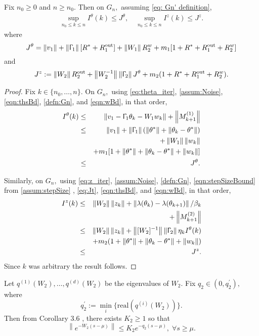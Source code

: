 \documentclass[usenames,dvipsnames,final,12pt]{colt2018} %
\newcommand{\vt}{v_1}
\newcommand{\Wt}{W_1}
\newcommand{\Tt}{\Upgamma_1}
\newcommand{\Mt}{M^{(1)}}
\newcommand{\mt}{m_1}
\newcommand{\Rto}{R_1^\textrm{out}}
\newcommand{\thS}{\theta^*}
\newcommand{\Tw}{\Upgamma_2}
\newcommand{\Ww}{W_2}
\newcommand{\Mw}{M^{(2)}}
\newcommand{\sw}{\beta}
\newcommand{\mw}{m_2}
\newcommand{\lz}{q_2}
\newcommand{\lzp}{q_2^\prime}
\newcommand{\Rzo}{R_2^{\textrm{out}}}
\newcommand{\Kz}{K_2}
\newcommand{\norm}[1]{\left\lVert#1\right\rVert}
\newcommand{\Rw}{R_2^w}
\newcommand{\Rs}{R^*}
\newcommand{\rl}{\textrm{real}}
\newcommand{\Jt}{J^\theta}
\newcommand{\Jz}{J^z}
\newcommand{\It}{I^\theta}
\newcommand{\Iz}{I^z}
\newcommand{\gugan}[1]{#1}
\begin{document}
\begin{lemma}
\label{lem:ItkBd}
Fix $n_0 \geq 0$ and $n \geq n_0.$ Then on $G_n,$ \gugan{assuming \eqref{eq: Gn' definition}},
%
\begin{align}
\sup_{n_0 \leq k \leq n} \It(k) \leq \Jt,\quad \sup_{n_0 \leq k \leq n} \Iz(k) \leq \Jz.
\end{align}
where
%
\[
\Jt = \norm{\vt} + \norm{\Tt}[ \Rs  + \Rto] + \norm{\Wt} \Rw + \mt [1 + \Rs + \Rto + \Rw]
\]
and
%
\[
\Jz := \norm{\Ww} \Rzo  +  \norm{\Ww^{-1}} \norm{\Tw} \Jt + \mw(1 + \Rs + \Rto + \Rw).
\]
%
\end{lemma}
\begin{proof}
Fix $k \in \{n_0, \ldots, n\}.$ On $G_n,$ using \eqref{eq:theta_iter}, \ref{assum:Noise}, \eqref{eqn:thsBd}, \eqref{defn:Gn}, and \eqref{eqn:wBd}, in that order,
%
\begin{eqnarray}
\It(k) & \leq & \norm{\vt - \Tt \theta_k - \Wt w_k} + \norm{\Mt_{k + 1}} \nonumber \\
%
& \leq & \norm{\vt} + \norm{\Tt}( \norm{\thS} + \norm{\theta_k - \thS}) \nonumber \\
& & + \norm{\Wt} \norm{w_k}  \nonumber \\
& & + \mt [1 + \norm{\thS} + \norm{\theta_k - \thS} + \norm{w_k}] \nonumber\\
& \leq & \Jt. \label{eq:Jt}
\end{eqnarray}
%

Similarly, on $G_n,$ using \eqref{eq:z_iter}, \ref{assum:Noise}, \eqref{defn:Gn}, \eqref{eqn:stepSizeBound} from \ref{assum:stepSize} %
, \eqref{eq:Jt}, \eqref{eqn:thsBd}, and \eqref{eqn:wBd}, in that order,
%
\begin{eqnarray*}
\Iz(k) & \leq & \norm{\Ww} \norm{z_k} + \norm{\lambda(\theta_k) - \lambda(\theta_{k + 1})} /\sw_k \\
& &  + \norm{\Mw_{k + 1}}\\
& \leq & \norm{\Ww} \norm{z_k} +  \norm{[\Ww]^{-1}} \norm{\Tw} \eta_k \It(k)\\
& & + \mw(1 + \norm{\thS} + \norm{\theta_k - \thS} + \norm{w_k})\\
& \leq & \Jz.
\end{eqnarray*}
%
Since $k$ was arbitrary the result follows.
\end{proof}

Let $q^{(1)}(\Ww), \ldots, q^{(d)}(\Ww)$ be the eigenvalues of $\Ww.$ Fix $\lz \in (0, \lzp),$ where $$\lzp := \min_i \{\rl(q^{(i)}(\Ww))\}.$$ Then from Corollary 3.6 \citep{teschl2004ordinary}, there exists $\Kz \geq 1$ so that
%
\begin{equation}
\label{eqn:zMatrixBd}
\norm{e^{-\Ww (s - \mu)}} \leq \Kz e^{-\lz(s - \mu)}, \; \forall s \geq \mu.
\end{equation}
\end{document}

